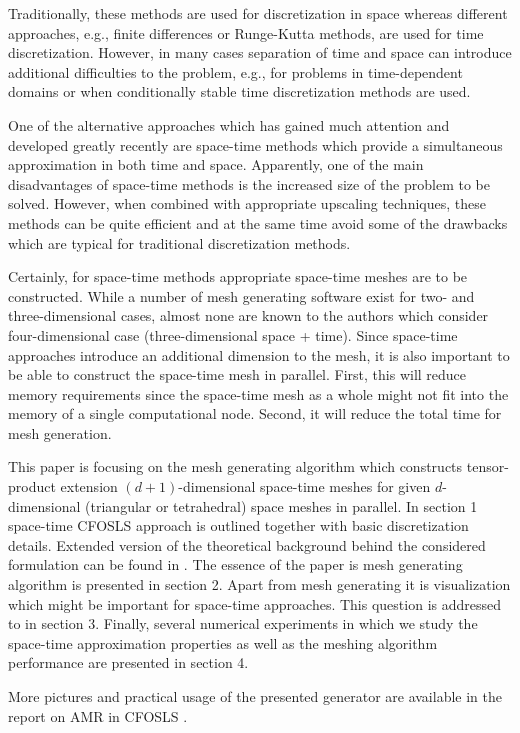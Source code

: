 \documentclass[12pt]{article}
\begin{document}
Traditionally, these methods are used for discretization in space whereas different approaches, e.g., finite differences or Runge-Kutta methods, are used for time discretization.
However, in many cases separation of time and space can introduce additional difficulties to the problem, e.g., for problems in time-dependent domains or when conditionally stable time discretization methods are used.  

One of the alternative approaches which has gained much attention and developed greatly recently are space-time methods which provide a simultaneous approximation in both time and space. Apparently, one of the main disadvantages of space-time methods is the increased size of the problem to be solved. However, when combined with appropriate upscaling techniques, these methods can be quite efficient and at the same time avoid some of the drawbacks which are typical for traditional discretization methods.

Certainly, for space-time methods appropriate space-time meshes are to be constructed. While a number of mesh generating software exist for two- and three-dimensional cases, almost none are known to the authors which consider four-dimensional case (three-dimensional space + time). Since space-time approaches introduce an additional dimension to the mesh, it is also important to be able to construct the space-time mesh in parallel. First, this will reduce memory requirements since the space-time mesh as a whole might not fit into the memory of a single computational node. Second, it will reduce the total time for mesh generation.

This paper is focusing on the mesh generating algorithm which constructs tensor-product extension $(d+1)$-dimensional space-time meshes for given $d$-dimensional  (triangular or tetrahedral) space meshes in parallel. In section 1 space-time CFOSLS approach is outlined together with basic discretization details. Extended version of the theoretical background behind the considered formulation can be found in \cite{our_cfosls_paper}. The essence of the paper is mesh generating algorithm is presented in section 2. Apart from mesh generating it is visualization which might be important for space-time approaches. This question is addressed to in section 3. Finally, several numerical experiments in which we study the space-time approximation properties as well as the meshing algorithm performance are presented in section 4.

More pictures and practical usage of the presented generator are available in the report on AMR in CFOSLS \cite{amr_cfosls_report}. 
\end{document}
